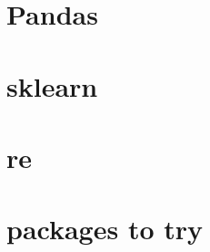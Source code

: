 \documentclass[11pt]{article}
\begin{document}
\section{Pandas}


\section{sklearn}

\begin{description}
  \setlength\itemsep{1pt}
  \item[Cross Validation:] 
\end{description}

\section{re}

\begin{description}
  \setlength\itemsep{1pt}
  \item{}

\end{description}

\section{packages to try}

\begin{description}
  \setlength\itemsep{1pt}
  \item[text from PDFs:] 
\end{description}



\end{document}

